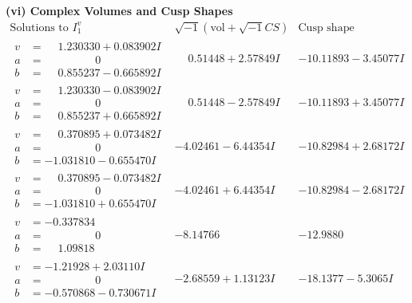 \documentclass[1p]{elsarticle_modified}
\theoremstyle{definition}
\newcommand{\I}{\sqrt{-1}}
\begin{document}
\newpage\flushleft \textbf{(vi) Complex Volumes and Cusp Shapes}
$$\begin{array}{c|c|c}  
\text{Solutions to }I^v_{1}& \I (\text{vol} + \sqrt{-1}CS) & \text{Cusp shape}\\
 \hline 
\begin{aligned}
v &= \phantom{-}1.230330 + 0.083902 I \\
a &= \phantom{-0.000000 } 0 \\
b &= \phantom{-}0.855237 - 0.665892 I\end{aligned}
 & \phantom{-}0.51448 + 2.57849 I & -10.11893 - 3.45077 I \\ \hline\begin{aligned}
v &= \phantom{-}1.230330 - 0.083902 I \\
a &= \phantom{-0.000000 } 0 \\
b &= \phantom{-}0.855237 + 0.665892 I\end{aligned}
 & \phantom{-}0.51448 - 2.57849 I & -10.11893 + 3.45077 I \\ \hline\begin{aligned}
v &= \phantom{-}0.370895 + 0.073482 I \\
a &= \phantom{-0.000000 } 0 \\
b &= -1.031810 - 0.655470 I\end{aligned}
 & -4.02461 - 6.44354 I & -10.82984 + 2.68172 I \\ \hline\begin{aligned}
v &= \phantom{-}0.370895 - 0.073482 I \\
a &= \phantom{-0.000000 } 0 \\
b &= -1.031810 + 0.655470 I\end{aligned}
 & -4.02461 + 6.44354 I & -10.82984 - 2.68172 I \\ \hline\begin{aligned}
v &= -0.337834\phantom{ +0.000000I} \\
a &= \phantom{-0.000000 } 0 \\
b &= \phantom{-}1.09818\phantom{ +0.000000I}\end{aligned}
 & -8.14766\phantom{ +0.000000I} & -12.9880\phantom{ +0.000000I} \\ \hline\begin{aligned}
v &= -1.21928 + 2.03110 I \\
a &= \phantom{-0.000000 } 0 \\
b &= -0.570868 - 0.730671 I\end{aligned}
 & -2.68559 + 1.13123 I & -18.1377 - 5.3065 I \\ \hline\begin{aligned}

\end{aligned}
\end{array}$$
\end{document}
